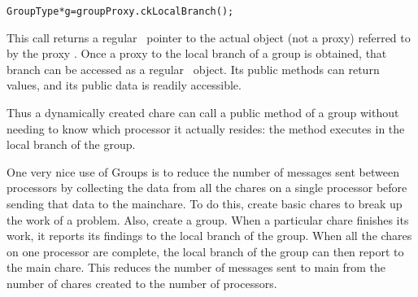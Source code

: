 \begin{alltt}
GroupType *g=groupProxy.ckLocalBranch();
\end{alltt}

This call returns a regular \CC\ pointer to the actual object (not a proxy)
referred to by the proxy .  Once a proxy to the
local branch of a group is obtained, that branch can be accessed as a regular
\CC\ object.  Its public methods can return values, and its public data is 
readily accessible.

Thus a dynamically created chare can call a public method of a
group without needing to know which processor it actually resides: the method
executes in the local branch of the group.

One very nice use of Groups is to reduce the number of messages sent between
processors by collecting the data from all the chares on a single processor
before sending that data to the mainchare.  To do this, create basic chares to
break up the work of a problem.  Also, create a group.  When a particular chare
finishes its work, it reports its findings to the local branch of the group.
When all the chares on one processor are complete, the local branch of the
group can then report to the main chare.  This reduces the number of messages
sent to main from the number of chares created to the number of processors. 








